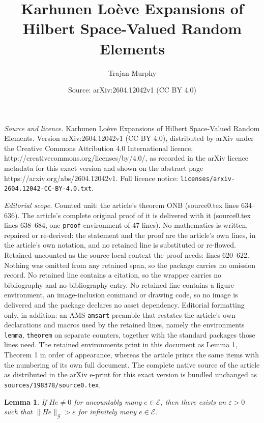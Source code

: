 \documentclass[10pt,a4paper]{amsart}
\title{Karhunen Lo\`eve Expansions of Hilbert Space-Valued Random Elements}
\author{Trajan Murphy}
\date{Source: arXiv:2604.12042v1 (CC BY 4.0)}
\newtheorem{lemma}{Lemma}
\begin{document}
\maketitle

\noindent\emph{Source and licence.} Karhunen Lo\`eve Expansions of Hilbert Space-Valued Random Elements. Version arXiv:2604.12042v1 (CC BY 4.0), distributed by arXiv under the Creative Commons Attribution 4.0 International licence, http://creativecommons.org/licenses/by/4.0/, as recorded in the arXiv licence metadata for this exact version and shown on the abstract page https://arxiv.org/abs/2604.12042v1. Full licence notice: \texttt{licenses/arxiv-2604.12042-CC-BY-4.0.txt}.\par\smallskip

\noindent\textit{Editorial scope.} Counted unit: the article's theorem ONB (source0.tex lines 634--636). The article's complete original proof of it is delivered with it (source0.tex lines 638--684, one \texttt{proof} environment of 47 lines). No mathematics is written, repaired or re-derived: the statement and the proof are the article's own lines, in the article's own notation, and no retained line is substituted or re-flowed.  Retained uncounted as the source-local context the proof needs: lines 620--622.  Nothing was omitted from any retained span, so the package carries no omission record.  No retained line contains a citation, so the wrapper carries no bibliography and no bibliography entry.  No retained line contains a figure environment, an image-inclusion command or drawing code, so no image is delivered and the package declares no asset dependency.  Editorial formatting only, in addition: an AMS \texttt{amsart} preamble that restates the article's own declarations and macros used by the retained lines, namely the environments \texttt{lemma}, \texttt{theorem} on separate counters, together with the standard packages those lines need.  The retained environments print in this document as Lemma 1, Theorem 1 in order of appearance, whereas the article prints the same items with the numbering of its own full document.  The complete native source of the article as distributed in the arXiv e-print for this exact version is bundled unchanged as \texttt{sources/198378/source0.tex}.
\begin{lemma} \label{He > 0 f.o}
    If $He \neq 0$ for uncountably many $e \in \mathscr E$, then there exists an $\varepsilon > 0$ such that $\|He\|_\mathcal G > \varepsilon$ for infinitely many $e \in \mathscr E$. 
\end{lemma}
\end{document}
